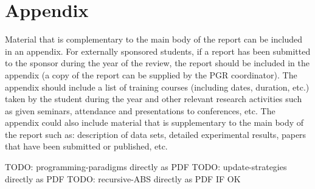\section{Appendix}
Material that is complementary to the main body of the report can be included in an appendix. For externally sponsored students, if a report has been submitted to the sponsor during the year of the review, the report should be included in the appendix (a copy of the report can be supplied by the PGR coordinator). The appendix should include a list of training courses (including dates, duration, etc.) taken by the student during the year and other relevant research activities such as given seminars, attendance and presentations to conferences, etc. The appendix could also include material that is supplementary to the main body of the report such as: description of data sets, detailed experimental results, papers that have been submitted or published, etc.

TODO: programming-paradigms directly as PDF
TODO: update-strategies directly as PDF
TODO: recursive-ABS directly as PDF IF OK